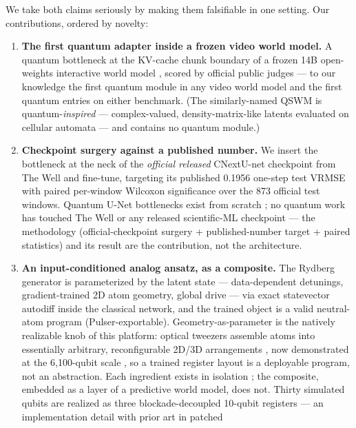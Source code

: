 \documentclass{article}
\begin{document}
We take both claims seriously by making them falsifiable in one setting.
Our contributions, ordered by novelty:
\begin{enumerate}
  \item \textbf{The first quantum adapter inside a frozen video world
  model.} A quantum bottleneck at the KV-cache chunk boundary of a frozen
  14B open-weights interactive world model
  \citep{gao2026lingbotworld,wan2025wan}, scored by official public judges
  \citep{li2025worldmodelbench,motamed2025physicsiq} --- to our knowledge
  the first quantum module in any video world model and the first quantum
  entries on either benchmark. (The similarly-named QSWM
  \citep{sun2026qswm} is quantum-\emph{inspired} --- complex-valued,
  density-matrix-like latents evaluated on cellular automata --- and
  contains no quantum module.)
  \item \textbf{Checkpoint surgery against a published number.} We insert
  the bottleneck at the neck of the \emph{official released} CNextU-net
  checkpoint from The Well and fine-tune, targeting its published 0.1956
  one-step test VRMSE \citep{ohana2024thewell} with paired per-window
  Wilcoxon significance over the 873 official test windows. Quantum
  U-Net bottlenecks exist from scratch
  \citep{ma2025qufex,liu2026hqfnet,ali2026phqfno}; no quantum work has
  touched The Well or any released scientific-ML checkpoint --- the
  methodology (official-checkpoint surgery + published-number target +
  paired statistics) and its result are the contribution, not the
  architecture.
  \item \textbf{An input-conditioned analog ansatz, as a composite.} The
  Rydberg generator is parameterized by the latent state --- data-dependent
  detunings, gradient-trained 2D atom geometry, global drive --- via exact
  statevector autodiff inside the classical network, and the trained object
  is a valid neutral-atom program (Pulser-exportable). Geometry-as-parameter
  is the natively realizable knob of this platform: optical tweezers
  assemble atoms into essentially arbitrary, reconfigurable 2D/3D
  arrangements \citep{barredo2018synthetic}, now demonstrated at the
  6{,}100-qubit scale \citep{manetsch2025tweezer}, so a trained register
  layout is a deployable program, not an abstraction. Each ingredient
  exists in isolation \citep{silver2024recon,chen2026resq,pulserdiff2025};
  the composite, embedded as a layer of a predictive world model, does not.
  Thirty simulated qubits are realized as three blockade-decoupled
  10-qubit registers --- an implementation detail with prior art in patched

\end{enumerate}
\end{document}

